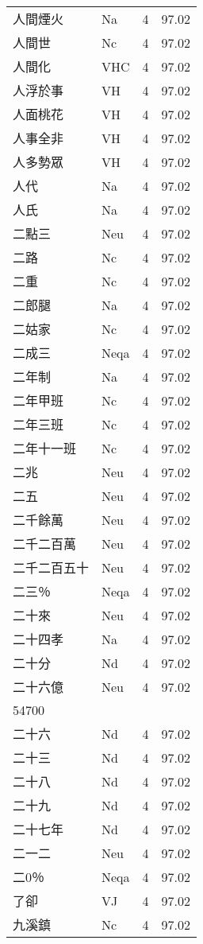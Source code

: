 \documentclass[twocolumn]{book}
\begin{document}
\begin{supertabular}{llrr}
人間煙火 & Na & 4 &  97.02\\
人間世 & Nc & 4 &  97.02\\
人間化 & VHC & 4 &  97.02\\
人浮於事 & VH & 4 &  97.02\\
人面桃花 & VH & 4 &  97.02\\
人事全非 & VH & 4 &  97.02\\
人多勢眾 & VH & 4 &  97.02\\
人代 & Na & 4 &  97.02\\
人氏 & Na & 4 &  97.02\\
二點三 & Neu & 4 &  97.02\\
二路 & Nc & 4 &  97.02\\
二重 & Nc & 4 &  97.02\\
二郎腿 & Na & 4 &  97.02\\
二姑家 & Nc & 4 &  97.02\\
二成三 & Neqa & 4 &  97.02\\
二年制 & Na & 4 &  97.02\\
二年甲班 & Nc & 4 &  97.02\\
二年三班 & Nc & 4 &  97.02\\
二年十一班 & Nc & 4 &  97.02\\
二兆 & Neu & 4 &  97.02\\
二五 & Neu & 4 &  97.02\\
二千餘萬 & Neu & 4 &  97.02\\
二千二百萬 & Neu & 4 &  97.02\\
二千二百五十 & Neu & 4 &  97.02\\
二三％ & Neqa & 4 &  97.02\\
二十來 & Neu & 4 &  97.02\\
二十四孝 & Na & 4 &  97.02\\
二十分 & Nd & 4 &  97.02\\
二十六億 & Neu & 4 &  97.02\\
54700\\
二十六 & Nd & 4 &  97.02\\
二十三 & Nd & 4 &  97.02\\
二十八 & Nd & 4 &  97.02\\
二十九 & Nd & 4 &  97.02\\
二十七年 & Nd & 4 &  97.02\\
二一二 & Neu & 4 &  97.02\\
二0％ & Neqa & 4 &  97.02\\
了卻 & VJ & 4 &  97.02\\
九溪鎮 & Nc & 4 &  97.02\\

\end{supertabular}
\end{document}

